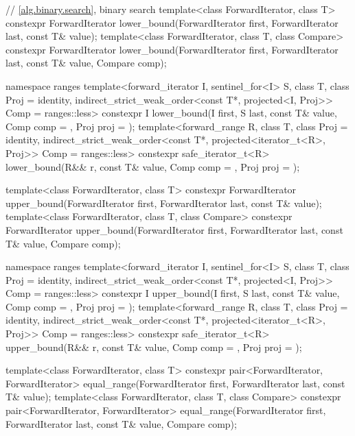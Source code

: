 \begin{codeblock}
{  // \ref{alg.binary.search}, binary search
  template<class ForwardIterator, class T>
    constexpr ForwardIterator
      lower_bound(ForwardIterator first, ForwardIterator last,
                  const T& value);
  template<class ForwardIterator, class T, class Compare>
    constexpr ForwardIterator
      lower_bound(ForwardIterator first, ForwardIterator last,
                  const T& value, Compare comp);

  namespace ranges {
    template<forward_iterator I, sentinel_for<I> S, class T, class Proj = identity,
             indirect_strict_weak_order<const T*, projected<I, Proj>> Comp = ranges::less>
      constexpr I lower_bound(I first, S last, const T& value, Comp comp = {},
                              Proj proj = {});
    template<forward_range R, class T, class Proj = identity,
             indirect_strict_weak_order<const T*, projected<iterator_t<R>, Proj>> Comp =
               ranges::less>
      constexpr safe_iterator_t<R>
        lower_bound(R&& r, const T& value, Comp comp = {}, Proj proj = {});
  }

  template<class ForwardIterator, class T>
    constexpr ForwardIterator
      upper_bound(ForwardIterator first, ForwardIterator last,
                  const T& value);
  template<class ForwardIterator, class T, class Compare>
    constexpr ForwardIterator
      upper_bound(ForwardIterator first, ForwardIterator last,
                  const T& value, Compare comp);

  namespace ranges {
    template<forward_iterator I, sentinel_for<I> S, class T, class Proj = identity,
             indirect_strict_weak_order<const T*, projected<I, Proj>> Comp = ranges::less>
      constexpr I upper_bound(I first, S last, const T& value, Comp comp = {}, Proj proj = {});
    template<forward_range R, class T, class Proj = identity,
             indirect_strict_weak_order<const T*, projected<iterator_t<R>, Proj>> Comp =
               ranges::less>
      constexpr safe_iterator_t<R>
        upper_bound(R&& r, const T& value, Comp comp = {}, Proj proj = {});
  }

  template<class ForwardIterator, class T>
    constexpr pair<ForwardIterator, ForwardIterator>
      equal_range(ForwardIterator first, ForwardIterator last,
                  const T& value);
  template<class ForwardIterator, class T, class Compare>
    constexpr pair<ForwardIterator, ForwardIterator>
      equal_range(ForwardIterator first, ForwardIterator last,
                  const T& value, Compare comp);

}
\end{codeblock}
